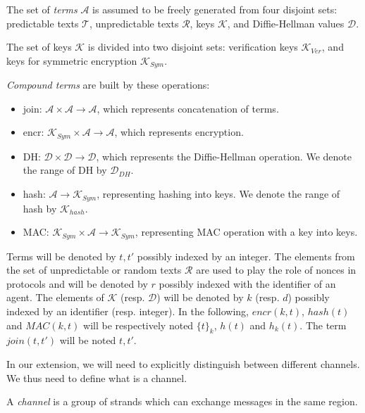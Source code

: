 \begin{Definition}
The set of \emph{terms} $\mathcal{A}$ is assumed to be freely generated from four disjoint sets: predictable texts $\mathcal{T}$, unpredictable texts $\mathcal{R}$,  keys $\mathcal{K}$, and Diffie-Hellman values $\mathcal{D}$.

The set of keys $\mathcal{K}$ is divided into two disjoint sets: verification keys $\mathcal{K}_{Ver}$, and keys for symmetric encryption $\mathcal{K}_{Sym}$.

\emph{Compound terms} are built by these operations:
\begin{itemize} 
\item join: $\mathcal{A} \times \mathcal{A} \rightarrow \mathcal{A}$, which represents concatenation of terms. 
\item encr: $\mathcal{K}_{Sym} \times \mathcal{A} \rightarrow \mathcal{A}$, which represents encryption. 
\item DH: $\mathcal{D} \times \mathcal{D} \rightarrow \mathcal{D}$, which represents the Diffie-Hellman operation. We denote the range of DH by $\mathcal{D}_{DH}$.
\item hash: $\mathcal{A} \rightarrow \mathcal{K}_{Sym}$, representing hashing into keys. We denote the range of hash by $\mathcal{K}_{hash}$. 
\item MAC: $\mathcal{K}_{Sym} \times \mathcal{A}  \rightarrow \mathcal{K}_{Sym}$, representing MAC operation with a key into keys.
\end{itemize}
\end{Definition} 

Terms will be denoted by $t, t'$ possibly indexed by an integer. 
The elements from the set of unpredictable or random texts $\mathcal{R}$ are used to play the role of nonces in protocols and will be denoted by $r$ possibly indexed with the identifier of an agent. The elements of $\mathcal{K}$ (resp. $\mathcal{D}$) will be denoted by $k$ (resp. $d$) possibly indexed by an identifier (resp. integer). In the following, $encr(k,t)$, $hash(t)$ and $MAC(k,t)$ will be respectively noted ${\{t\}}_k$, $h(t)$ and $h_k(t)$. The term $join(t,t')$ will be noted $t,t'$. 

In our extension, we will need to explicitly distinguish between different channels. We thus need to define what is a channel.

\begin{Definition}[Channel] A \emph{channel} is a group of strands which can exchange messages in the same region.
\end{Definition} 

